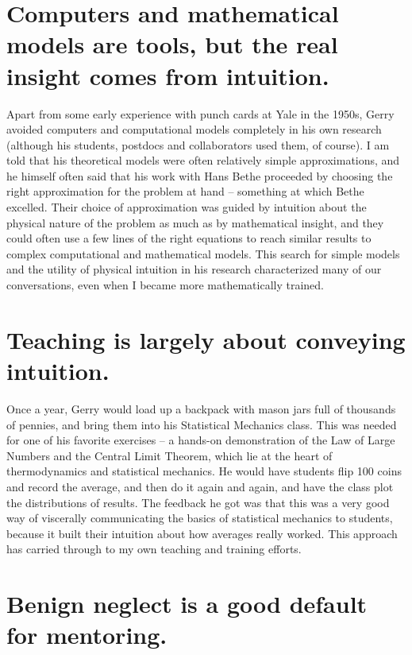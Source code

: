 \section*{Computers and mathematical models are tools, but the real insight
comes from intuition.}

Apart from some early experience with punch cards at Yale in the
1950s, Gerry avoided computers and computational models completely in
his own research (although his students, postdocs and collaborators
used them, of course). I am told that his theoretical models were
often relatively simple approximations, and he himself often said that
his work with Hans Bethe proceeded by choosing the right approximation
for the problem at hand -- something at which Bethe excelled. Their
choice of approximation was guided by intuition about the physical
nature of the problem as much as by mathematical insight, and they
could often use a few lines of the right equations to reach similar
results to complex computational and mathematical models. This search
for simple models and the utility of physical intuition in his
research characterized many of our conversations, even when I became
more mathematically trained.

\section*{Teaching is largely about conveying intuition.}

Once a year, Gerry would load up a backpack with mason jars full of
thousands of pennies, and bring them into his Statistical Mechanics
class. This was needed for one of his favorite exercises -- a hands-on
demonstration of the Law of Large Numbers and the Central Limit
Theorem, which lie at the heart of thermodynamics and statistical
mechanics. He would have students flip 100 coins and record the
average, and then do it again and again, and have the class plot the
distributions of results. The feedback he got was that this was a very
good way of viscerally communicating the basics of statistical
mechanics to students, because it built their intuition about how
averages really worked. This approach has carried through to my own
teaching and training efforts.

\section*{Benign neglect is a good default for mentoring.}

